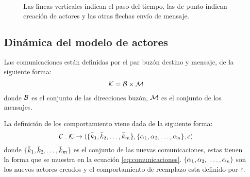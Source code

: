 \begin{figure}[H]
\begin{subfigure}{.5\textwidth}

\caption{}
\label{fig:actores:crecion:b}
\end{subfigure}

\caption{Las lineas verticales indican el paso del tiempo, las de punto indican creación de actores y las otras flechas envío de mensaje.}
\label{fig:actores:crecion}
\end{figure}


\subsection{Dinámica del modelo de actores}

Las comunicaciones están definidas por el par buzón destino y mensaje, de la siguiente forma:
\begin{align}\label{eq:comunicaciones}
\mathcal{K} = \mathcal{B} \times \mathcal{M}
\end{align}
donde $\mathcal{B}$ es el conjunto de las direcciones buzón, $\mathcal{M}$ es el conjunto de los mensajes. 

La definición de los comportamiento viene dada de la siguiente forma:
\begin{align}\label{eq:comportamientos}
\mathcal{C} : \mathcal{K} \rightarrow ( \{ \bar{k}_1, \bar{k}_2, \ldots, \bar{k}_m \}, \{ \alpha_1, \alpha_2, \ldots, \alpha_n \}, c )
\end{align}
donde $\{ \bar{k}_1, \bar{k}_2, \ldots, \bar{k}_m \}$ es el conjunto de las nuevas comunicaciones, estas tienen la forma que se muestra en la ecuación \ref{eq:comunicaciones}. $\{ \alpha_1, \alpha_2,$ $ \ldots, \alpha_n \}$ son los nuevos actores creados y el comportamiento de reemplazo esta definido por $c$.

